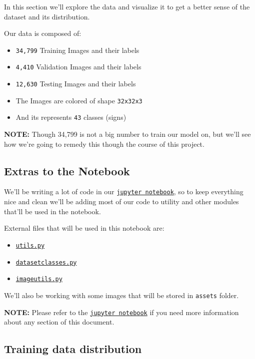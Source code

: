 \documentclass[11pt]{article}
\providecommand{\tightlist}{%
      \setlength{\itemsep}{0pt}\setlength{\parskip}{0pt}}
\begin{document}
In this section we'll explore the data and visualize it to get a better
sense of the dataset and its distribution.

Our data is composed of:

\begin{itemize}
\tightlist
\item
  \texttt{34,799} Training Images and their labels
\item
  \texttt{4,410} Validation Images and their labels
\item
  \texttt{12,630} Testing Images and their labels
\item
  The Images are colored of shape \texttt{32x32x3}
\item
  And its represents \texttt{43} classes (signs)
\end{itemize}

\textbf{NOTE:} Though 34,799 is not a big number to train our model on,
but we'll see how we're going to remedy this though the course of this
project.

    \hypertarget{extras-to-the-notebook}{%
\subsection{Extras to the Notebook}\label{extras-to-the-notebook}}

We'll be writing a lot of code in our
\href{Traffic_Sign_Classifier.ipynb}{\texttt{jupyter\ notebook}}, so to
keep everything nice and clean we'll be adding most of our code to
utility and other modules that'll be used in the notebook.

External files that will be used in this notebook are:

\begin{itemize}
\tightlist
\item
  \href{utils.py}{\texttt{utils.py}}
\item
  \href{datasetclasses.py}{\texttt{datasetclasses.py}}
\item
  \href{imageutils.py}{\texttt{imageutils.py}}
\end{itemize}

We'll also be working with some images that will be stored in
\texttt{assets} folder.

\textbf{NOTE:} Please refer to the
\href{Traffic_Sign_Classifier.ipynb}{\texttt{jupyter\ notebook}} if you
need more information about any section of this document.

    \hypertarget{training-data-distribution}{%
\subsection{Training data
distribution}\label{training-data-distribution}}
\end{document}
